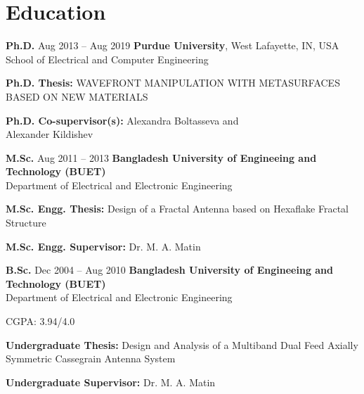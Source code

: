 \documentclass[cvauthor={Dr. Sajid Muhaimin Choudhury}]{buetcv}
\begin{document}
\section{Education}
        \begin{threecolentry}{\textbf{Ph.D.}}{
            Aug 2013 – Aug 2019
        }
            \textbf{Purdue University}, West Lafayette, IN, USA \\ School of Electrical and Computer Engineering
            \begin{highlights}
                \item \textbf{Ph.D. Thesis:} WAVEFRONT MANIPULATION WITH METASURFACES BASED ON NEW MATERIALS                 
                \item \textbf{Ph.D. Co-supervisor(s):} Alexandra Boltasseva and \\ Alexander Kildishev
            \end{highlights}
        \end{threecolentry}
        \begin{threecolentry}{\textbf{M.Sc. }}{
            Aug 2011 – 2013
        }
        \textbf{Bangladesh University of Engineeing and Technology (BUET)} \\ Department of Electrical and Electronic Engineering
            \begin{highlights}
                \item \textbf{M.Sc. Engg. Thesis:} Design of a Fractal Antenna based on Hexaflake Fractal Structure                 
                \item \textbf{M.Sc. Engg. Supervisor:} Dr. M. A. Matin 
            \end{highlights}
        \end{threecolentry}
        \begin{threecolentry}{\textbf{B.Sc.}}{
            Dec 2004 – Aug 2010
        }
            \textbf{Bangladesh University of Engineeing and Technology (BUET)} \\ Department of Electrical and Electronic Engineering
            \begin{highlights}
                \item CGPA: 3.94/4.0 
                \item \textbf{Undergraduate Thesis:} Design and Analysis of a Multiband Dual Feed Axially Symmetric Cassegrain Antenna System
                \item \textbf{Undergraduate Supervisor:} Dr. M. A. Matin 
            \end{highlights}
        \end{threecolentry}
\end{document}
